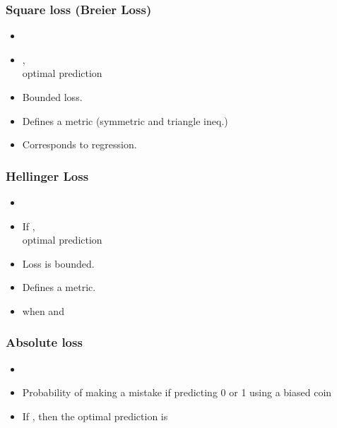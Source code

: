 \documentclass[handout]{beamer}
\begin{document}
\begin{frame}
\frametitle{Square loss (Breier Loss)}
\begin{itemize}
\item
\R{\[ \lambda_{\text{sq}}(\omega,\gamma)  = (\omega-\gamma)^2 \]}
\item
{}, \\
optimal prediction 
\item
Bounded loss.
\item
Defines a metric (symmetric and triangle ineq.)
\item
Corresponds to regression.
\end{itemize}
\end{frame}

\begin{frame}
\frametitle{Hellinger Loss}

\begin{itemize}
\item
\R{\[ \lambda_{\text{hel}}(\omega,\gamma)  = \frac{1}{2} \paren{
\paren{\sqrt{\omega} +\sqrt{\gamma}}^2 + 
\paren{\sqrt{1-\omega}+\sqrt{1-\gamma}}^2 
} \] } 
\item
If , \\
optimal prediction 
\item
Loss is bounded.
\item
Defines a metric.
\item 
{} when 
 and 
\end{itemize}
\end{frame}

\begin{frame}
\frametitle{Absolute loss}

\begin{itemize}
\item
\R{\[ \lambda(\omega,\gamma) = | \omega -\gamma | \]}
\item
Probability of making a mistake if predicting 0 or 1 
using a biased coin\\
\item
If , then the optimal prediction is 
\R{\[
\gamma^t = 
\begin{cases} 1 & \text{if $q>1/2$,} \\
              0 & \text{otherwise}
\end{cases}
\]}
\end{itemize}
\end{frame}
\end{document}
